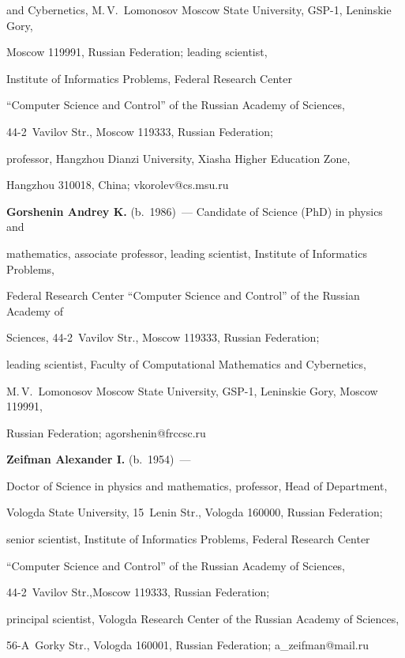 and Cybernetics, M.\,V.~Lomonosov Moscow State University, GSP-1, Leninskie Gory, 


Moscow 119991, Russian Federation; leading scientist, 


Institute of Informatics Problems, Federal Research Center 


``Computer Science and Control'' of the Russian Academy of Sciences, 


44-2~Vavilov Str., Moscow 119333, Russian Federation; 


professor, Hangzhou Dianzi University, Xiasha Higher Education Zone, 


Hangzhou 310018, China; \mbox{vkorolev@cs.msu.ru}





\vspace*{1pt}





\noindent


\textbf{Gorshenin Andrey K.} (b.\ 1986)~--- Candidate of Science (PhD) in physics and


mathematics, associate professor, leading scientist, Institute of Informatics Problems,


Federal Research Center ``Computer Science and Control'' of the Russian Academy of


Sciences, 44-2~Vavilov Str., Moscow 119333, Russian Federation;  


leading scientist, Faculty of Computational Mathematics and Cybernetics, 


M.\,V.~Lomonosov Moscow State University, GSP-1, Leninskie Gory, Moscow 119991, 


Russian Federation; \mbox{agorshenin@frccsc.ru}





\vspace*{1pt}





\noindent


\textbf{Zeifman Alexander I.} (b.\ 1954)~--- 


Doctor of Science in physics and mathematics, professor, Head of Department, 


Vologda State University, 15~Lenin Str., Vologda 160000, Russian Federation; 


senior scientist, Institute of Informatics Problems, Federal Research Center 


``Computer Science and Control'' of the Russian Academy of Sciences, 


44-2~Vavilov Str.,Moscow 119333, Russian Federation; 


principal scientist, Vologda Research Center of the Russian Academy of Sciences, 


56-A~Gorky Str., Vologda 160001, Russian Federation; \mbox{a\_zeifman@mail.ru}


\label{end\stat}





\renewcommand{\bibname}{\protect\rm Литература}       


